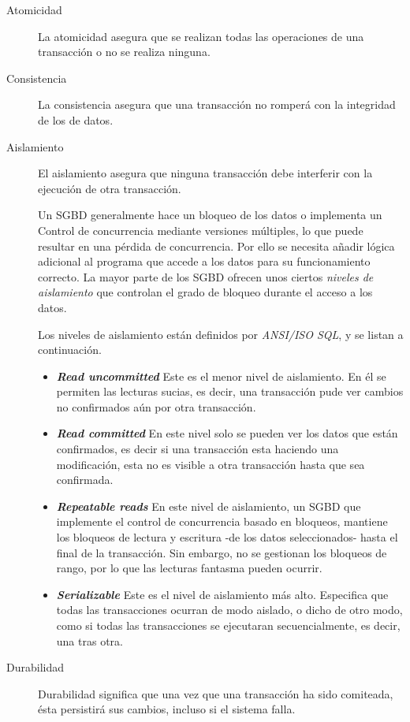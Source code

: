	\begin{description}
	\item[Atomicidad]
		La atomicidad asegura que se realizan todas las operaciones de una transacción
		o no se realiza ninguna.
		
	\item[Consistencia]
		 La consistencia asegura que una transacción no romperá con la integridad de
		 los de datos.
	  
	\item[Aislamiento]	
		El aislamiento asegura que ninguna transacción debe interferir con la
		ejecución de otra transacción.
		
		Un SGBD generalmente hace un bloqueo de los datos o implementa un Control de
		concurrencia mediante versiones múltiples, lo que puede resultar en una
		pérdida de concurrencia. Por ello se necesita añadir lógica adicional al
		programa que accede a los datos para su funcionamiento correcto.
		La mayor parte de los SGBD ofrecen unos ciertos \emph{niveles de aislamiento}
		que controlan el grado de bloqueo durante el acceso a los datos.
		
		Los niveles de aislamiento están definidos por \emph{ANSI/ISO SQL}, y se listan
		a continuación.
		
		\begin {itemize}
		
			\item{\bf \emph{Read uncommitted}}
				Este es el menor nivel de aislamiento. En él se permiten las lecturas
				sucias, es decir, una transacción pude ver cambios no confirmados
				aún por otra transacción.
			
			\item {\bf \emph{Read committed}}
				En este nivel solo se pueden ver los datos que están confirmados, es decir si
				una  transacción esta haciendo una modificación, esta no es visible a otra
				transacción hasta que sea confirmada.
				
			\item {\bf \emph{Repeatable reads}} 
				En este nivel de aislamiento, un SGBD que implemente el control de
				concurrencia basado en bloqueos, mantiene los bloqueos de lectura y escritura
				-de los datos seleccionados- hasta el final de la transacción. Sin embargo, no
				se gestionan los bloqueos de rango, por lo que las lecturas fantasma pueden
				ocurrir.
			
				
		  \item {\bf \emph{Serializable}}
				Este es el nivel de aislamiento más alto. Especifica que todas las
				transacciones ocurran de modo aislado, o dicho de otro modo, como si todas las
				transacciones se ejecutaran secuencialmente, es decir, una tras otra. 
			
			\end{itemize}
	  	
	\item[Durabilidad]
		
		Durabilidad significa que una vez que una transacción ha sido comiteada, ésta
		persistirá sus cambios, incluso si el sistema falla.
	
	\end{description}
		

